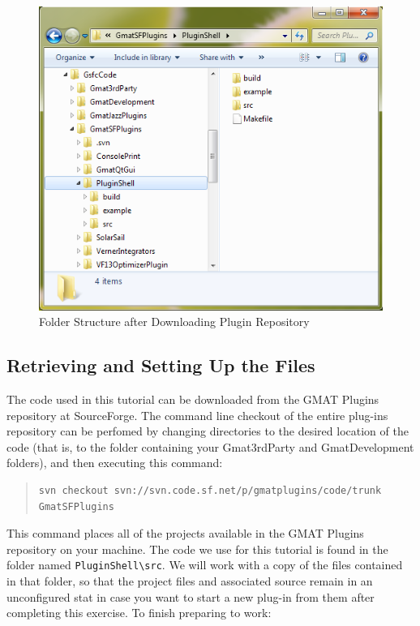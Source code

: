 \documentclass[10pt,letterpaper]{article}
\begin{document}
\begin{figure}[htb]
\begin{center}
\includegraphics[scale=0.5]{images/FileStructure.png} 
\caption{\label{files}Folder Structure after Downloading Plugin Repository}
\end{center}
\end{figure}

\subsection{\label{settingUp}Retrieving and Setting Up the Files}

The code used in this tutorial can be downloaded from the GMAT Plugins repository at SourceForge.  The command line checkout of the entire plug-ins repository can be perfomed by changing directories to the desired location of the code (that is, to the folder containing your Gmat3rdParty and GmatDevelopment folders), and then executing this command:
\begin{quote}
\begin{verbatim}
svn checkout svn://svn.code.sf.net/p/gmatplugins/code/trunk GmatSFPlugins
\end{verbatim}
\end{quote}
\noindent This command places all of the projects available in the GMAT Plugins repository on your machine.  The code we use for this tutorial is found in the folder named \texttt{PluginShell{\textbackslash}src}.  We will work with a copy of the files contained in that folder, so that the project files and associated source remain in an unconfigured stat in case you want to start a new plug-in from them after completing this exercise.  To finish preparing to work:
\end{document}
